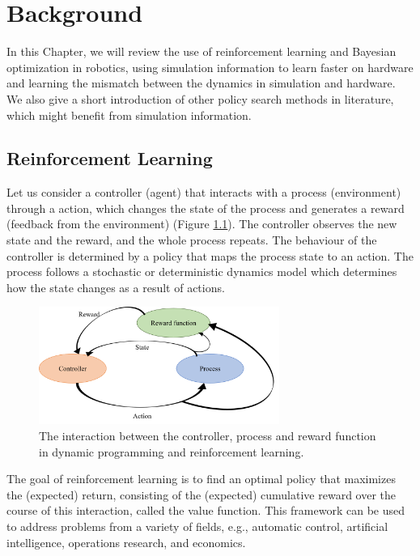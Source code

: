 \chapter{Background}
\label{chap:back}

In this Chapter, we will review the use of reinforcement learning and Bayesian optimization in robotics, using simulation information to learn faster on hardware and learning the mismatch between the dynamics in simulation and hardware. We also give a short introduction of other policy search methods in literature, which might benefit from simulation information.


\section{Reinforcement Learning}
\label{sec:dp}

Let us consider a controller (agent) that interacts with a process (environment) through a action, which changes the state of the process and generates a reward (feedback from the environment) (Figure \ref{fig:rl}). The controller observes the new state and the reward, and the whole process repeats. The behaviour of the controller is determined by a policy that maps the process state to an action. The process follows a stochastic or deterministic dynamics model which determines how the state changes as a result of actions. 

\begin{figure}[t]
    \centering
    \includegraphics[width=0.7\textwidth]{img/reinforcementLearning.png}
    \caption{The interaction between the controller, process and reward function in dynamic programming and reinforcement learning.}
    \label{fig:rl}
\end{figure}

The goal of reinforcement learning is to find an optimal policy that maximizes the (expected) return, consisting of the (expected) cumulative reward over the course of this interaction, called the value function. This framework can be used to address problems from a variety of fields, e.g., automatic control, artificial intelligence, operations research, and economics.

